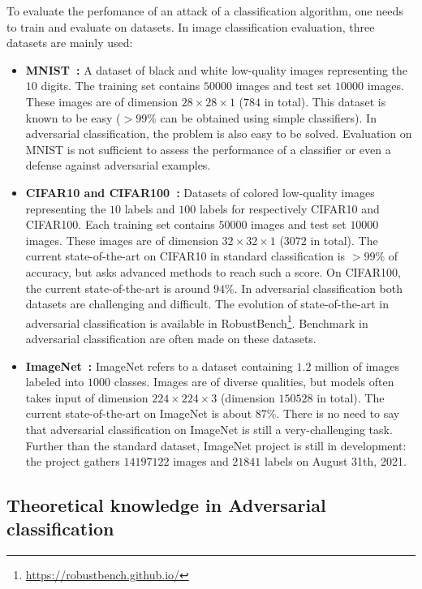 To evaluate the perfomance of an attack of a classification algorithm, one needs to train and evaluate on datasets. In image classification evaluation, three datasets are mainly used:
\begin{itemize}
    \item \textbf{MNIST~\citep{lecun1998mnist}:} A dataset of black and white low-quality images representing the $10$ digits. The training set contains $50000$ images and test set $10000$ images. These images are of dimension $28\times28\times 1$ ($784$ in total). This dataset is known to be easy ($>99\%$ can be obtained using simple classifiers). In adversarial classification, the problem is also easy to be solved. Evaluation on MNIST is not sufficient to assess the performance of a classifier or even a defense against adversarial examples.
    \item \textbf{CIFAR10 and CIFAR100~\citep{krizhevsky2009learning}:} Datasets of colored low-quality images representing the $10$ labels and $100$ labels for respectively CIFAR10 and CIFAR100. Each training set contains $50000$ images and test set $10000$ images. These images are of dimension $32\times32\times 1$ ($3072$ in total). The current state-of-the-art on CIFAR10 in standard classification is $>99\%$ of accuracy, but asks advanced methods to reach such a score. On CIFAR100, the current state-of-the-art is around $94\%$. In adversarial classification both datasets are challenging and difficult. The evolution of state-of-the-art in adversarial classification is available in RobustBench\footnote{\url{https://robustbench.github.io/}}. Benchmark in adversarial classification are often made on these datasets.
    \item \textbf{ImageNet~\citep{imagenet_cvpr09}:} ImageNet refers to a dataset containing $1.2$ million of images labeled into $1000$ classes. Images are of diverse qualities, but models often takes input of dimension $224\times224\times 3$ (dimension $150528$ in total). The current state-of-the-art on ImageNet is about $87\%$. There is no need to say that adversarial classification on ImageNet is still a very-challenging task. Further than the standard dataset, ImageNet project is still in development: the project gathers $14197122$ images and $21841$ labels on August 31th, 2021.   

\end{itemize}




\subsection{Theoretical knowledge in Adversarial classification}


